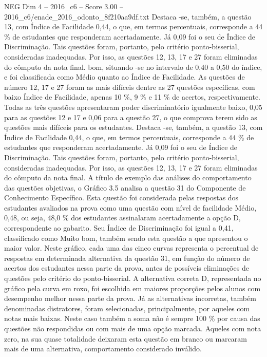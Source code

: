 \begin{textsample}{NEG Dim 4 – 2016\_c6 – Score 3.00 – 2016\_c6/enade\_2016\_odonto\_8f210aa9df.txt}
Destaca -se, também, a questão 13, com Índice de Facilidade 0,44, o que, em termos percentuais, corresponde a 44 \% de estudantes que responderam acertadamente.
Já 0,09 foi o seu de Índice de Discriminação.
Tais questões foram, portanto, pelo critério ponto-bisserial, consideradas inadequadas.
Por isso, as questões 12, 13, 17 e 27 foram eliminadas do cômputo da nota final. bom, situando -se no intervalo de 0,40 a 0,50 do índice, e foi classificada como Médio quanto ao Índice de Facilidade.
As questões de número 12, 17 e 27 foram as mais difíceis dentre as 27 questões específicas, com baixo Índice de Facilidade, apenas 10 \%, 9 \% e 11 \% de acertos, respectivamente.
Todas as três questões apresentaram poder discriminatório igualmente baixo, 0,05 para as questões 12 e 17 e 0,06 para a questão 27, o que comprova terem sido as questões mais difíceis para os estudantes.
Destaca -se, também, a questão 13, com Índice de Facilidade 0,44, o que, em termos percentuais, corresponde a 44 \% de estudantes que responderam acertadamente.
Já 0,09 foi o seu de Índice de Discriminação.
Tais questões foram, portanto, pelo critério ponto-bisserial, consideradas inadequadas.
Por isso, as questões 12, 13, 17 e 27 foram eliminadas do cômputo da nota final.
A título de exemplo das análises do comportamento das questões objetivas, o Gráfico 3.5 analisa a questão 31 do Componente de Conhecimento Específico.
Esta questão foi considerada pelas respostas dos estudantes avaliados na prova como uma questão com nível de facilidade Médio, 0,48, ou seja, 48,0 \% dos estudantes assinalaram acertadamente a opção D, correspondente ao gabarito.
Seu Índice de Discriminação foi igual a 0,41, classificado como Muito bom, também sendo esta questão a que apresentou o maior valor.
Neste gráfico, cada uma das cinco curvas representa o percentual de respostas em determinada alternativa da questão 31, em função do número de acertos dos estudantes nessa parte da prova, antes de possíveis eliminações de questões pelo critério do ponto-bisserial.
A alternativa correta D, representada no gráfico pela curva em roxo, foi escolhida em maiores proporções pelos alunos com desempenho melhor nessa parte da prova.
Já as alternativas incorretas, também denominadas distratores, foram selecionadas, principalmente, por aqueles com notas mais baixas.
Neste caso também a soma não é sempre 100 \% por causa das questões não respondidas ou com mais de uma opção marcada.
Aqueles com nota zero, na sua quase totalidade deixaram esta questão em branco ou marcaram mais de uma alternativa, comportamento considerado inválido.

\end{textsample}
